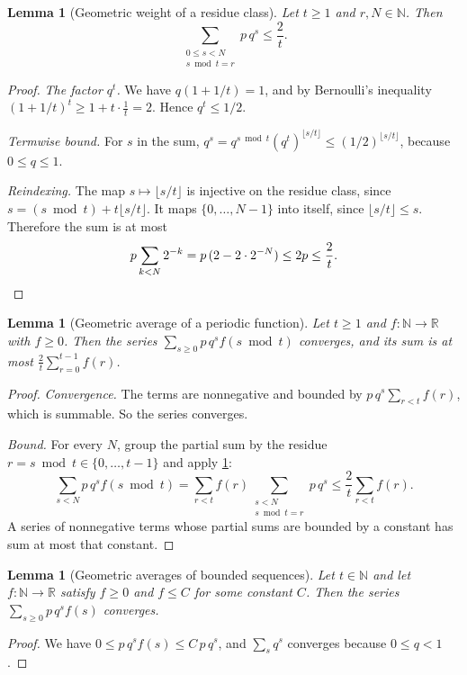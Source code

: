 \documentclass[11pt]{article}
\newtheorem{lemma}[theorem]{Lemma}
\theoremstyle{definition}
\theoremstyle{remark}
\newcommand{\R}{\mathbb{R}}
\newcommand{\N}{\mathbb{N}}
\begin{document}
\begin{lemma}[Geometric weight of a residue class]\label{lem:mc_geom_mod_coeff}
Let $t\ge1$ and $r,N\in\N$. Then
\[
\sum_{\substack{0\le s<N\\ s\bmod t=r}}p\,q^s\le\frac2t .
\]
\end{lemma}
\begin{proof}
\emph{The factor $q^t$.} We have $q(1+1/t)=1$, and by Bernoulli's inequality $(1+1/t)^t\ge1+t\cdot\frac1t=2$. Hence $q^t\le1/2$.

\emph{Termwise bound.} For $s$ in the sum, $q^s=q^{s\bmod t}(q^t)^{\lfloor s/t\rfloor}\le(1/2)^{\lfloor s/t\rfloor}$, because $0\le q\le1$.

\emph{Reindexing.} The map $s\mapsto\lfloor s/t\rfloor$ is injective on the residue class, since $s=(s\bmod t)+t\lfloor s/t\rfloor$. It maps $\{0,\dots,N-1\}$ into itself, since $\lfloor s/t\rfloor\le s$. Therefore the sum is at most
\[
p\sum_{k<N}2^{-k}=p\,(2-2\cdot2^{-N})\le2p\le\frac2t. \qedhere
\]
\end{proof}

\begin{lemma}[Geometric average of a periodic function]\label{lem:mc_geom_mod}
Let $t\ge1$ and $f:\N\to\R$ with $f\ge0$. Then the series $\sum_{s\ge0}p\,q^sf(s\bmod t)$ converges, and its sum is at most $\frac2t\sum_{r=0}^{t-1}f(r)$.
\end{lemma}
\begin{proof}
\emph{Convergence.} The terms are nonnegative and bounded by $p\,q^s\sum_{r<t}f(r)$, which is summable. So the series converges.

\emph{Bound.} For every $N$, group the partial sum by the residue $r=s\bmod t\in\{0,\dots,t-1\}$ and apply \cref{lem:mc_geom_mod_coeff}:
\[
\sum_{s<N}p\,q^sf(s\bmod t)=\sum_{r<t}f(r)\sum_{\substack{s<N\\ s\bmod t=r}}p\,q^s\le\frac2t\sum_{r<t}f(r).
\]
A series of nonnegative terms whose partial sums are bounded by a constant has sum at most that constant.
\end{proof}

\begin{lemma}[Geometric averages of bounded sequences]\label{lem:mc_geom_summable_bdd}
Let $t\in\N$ and let $f:\N\to\R$ satisfy $f\ge0$ and $f\le C$ for some constant $C$. Then the series $\sum_{s\ge0}p\,q^sf(s)$ converges.
\end{lemma}
\begin{proof}
We have $0\le p\,q^sf(s)\le C\,p\,q^s$, and $\sum_sq^s$ converges because $0\le q<1$.
\end{proof}
\end{document}
